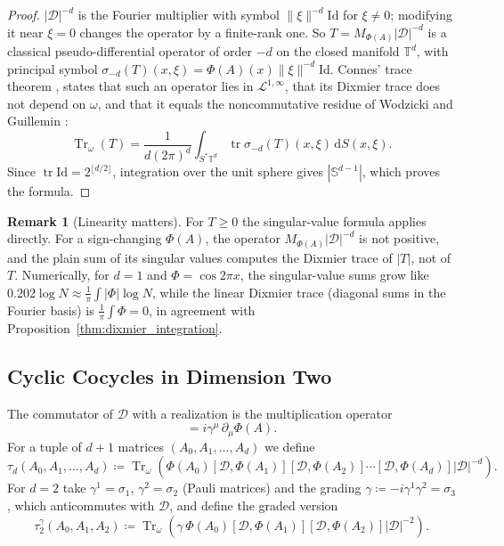 \documentclass[11pt,a4paper,reqno]{amsart}
\theoremstyle{definition}
\newtheorem{remark}[theorem]{Remark}
\numberwithin{equation}{section}
\newcommand{\Id}{\mathrm{Id}}
\newcommand{\Tr}{\operatorname{Tr}}
\newcommand{\dif}{\,\mathrm{d}}
\begin{document}
\begin{proof}
$|\mathcal{D}|^{-d}$ is the Fourier multiplier with symbol $\|\xi\|^{-d}\Id$ for $\xi \ne 0$; modifying it near $\xi = 0$ changes the operator by a finite-rank one. So $T = M_{\Phi(A)}|\mathcal{D}|^{-d}$ is a classical pseudo-differential operator of order $-d$ on the closed manifold $\mathbb{T}^d$, with principal symbol $\sigma_{-d}(T)(x,\xi) = \Phi(A)(x)\|\xi\|^{-d}\Id$. Connes' trace theorem \cite{connes1988action}, \cite[Ch.~IV, Sect.~2, Prop.~5]{connes1994noncommutative} states that such an operator lies in $\mathcal{L}^{1,\infty}$, that its Dixmier trace does not depend on $\omega$, and that it equals the noncommutative residue of Wodzicki and Guillemin \cite{wodzicki1987noncommutative,guillemin1985new}:
\begin{equation}
    \Tr_\omega(T) = \frac{1}{d (2\pi)^d} \int_{S^*\mathbb{T}^d} \operatorname{tr} \sigma_{-d}(T)(x, \xi) \dif S(x, \xi).
\end{equation}
Since $\operatorname{tr}\Id = 2^{\lfloor d/2 \rfloor}$, integration over the unit sphere gives $|\mathbb{S}^{d-1}|$, which proves the formula.
\end{proof}

\begin{remark}[Linearity matters]
For $T \ge 0$ the singular-value formula applies directly. For a sign-changing $\Phi(A)$, the operator $M_{\Phi(A)}|\mathcal{D}|^{-d}$ is not positive, and the plain sum of its singular values computes the Dixmier trace of $|T|$, not of $T$. Numerically, for $d = 1$ and $\Phi = \cos 2\pi x$, the singular-value sums grow like $0.202\log N \approx \frac{1}{\pi}\int|\Phi| \log N$, while the linear Dixmier trace (diagonal sums in the Fourier basis) is $\frac{1}{\pi}\int\Phi = 0$, in agreement with Proposition~\ref{thm:dixmier_integration}.
\end{remark}

\subsection{Cyclic Cocycles in Dimension Two}
The commutator of $\mathcal{D}$ with a realization is the multiplication operator
\begin{equation}
    [\mathcal{D}, M_{\Phi(A)}] = i \gamma^\mu \, \partial_\mu \Phi(A).
\end{equation}
For a tuple of $d+1$ matrices $(A_0, A_1, \dots, A_d)$ we define
\begin{equation}
    \tau_d(A_0, A_1, \dots, A_d) \coloneqq \Tr_\omega \left( \Phi(A_0) [\mathcal{D}, \Phi(A_1)] [\mathcal{D}, \Phi(A_2)] \cdots [\mathcal{D}, \Phi(A_d)] |\mathcal{D}|^{-d} \right).
\end{equation}
For $d = 2$ take $\gamma^1 = \sigma_1$, $\gamma^2 = \sigma_2$ (Pauli matrices) and the grading $\gamma \coloneqq -i\gamma^1\gamma^2 = \sigma_3$, which anticommutes with $\mathcal{D}$, and define the graded version
\begin{equation}
    \tau_2^\gamma(A_0, A_1, A_2) \coloneqq \Tr_\omega \left( \gamma\, \Phi(A_0) [\mathcal{D}, \Phi(A_1)] [\mathcal{D}, \Phi(A_2)] |\mathcal{D}|^{-2} \right).
\end{equation}
\end{document}
